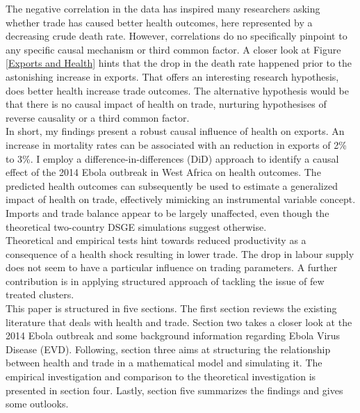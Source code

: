 \documentclass{article}
\begin{document}
The negative correlation in the data has inspired many researchers asking whether trade has caused better health outcomes, here represented by a decreasing crude death rate. However, correlations do no specifically pinpoint to any specific causal mechanism or third common factor. A closer look at Figure \ref{Exports and Health} hints that the drop in the death rate happened prior to the astonishing increase in exports. That offers an interesting research hypothesis, does better health increase trade outcomes. The alternative hypothesis would be that there is no causal impact of health on trade, nurturing hypothesises of reverse causality or a third common factor.\\
In short, my findings present a robust causal influence of health on exports. An increase in mortality rates can be associated with an reduction in exports of 2\% to 3\%. I employ a difference-in-differences (DiD) approach to identify a causal effect of the 2014 Ebola outbreak in West Africa on health outcomes. The predicted health outcomes can subsequently be used to estimate a generalized impact of health on trade, effectively mimicking an instrumental variable concept. Imports and trade balance appear to be largely unaffected, even though the theoretical two-country DSGE simulations suggest otherwise. \\
Theoretical and empirical tests hint towards reduced productivity as a consequence of a health shock resulting in lower trade. The drop in labour supply does not seem to have a particular influence on trading parameters. A further contribution is in applying structured approach of tackling the issue of few treated clusters.
\\
This paper is structured in five sections. The first section reviews the existing literature that deals with health and trade. Section two takes a closer look at the 2014 Ebola outbreak and some background information regarding Ebola Virus Disease (EVD). Following, section three aims at structuring the relationship between health and trade in a mathematical model and simulating it. The empirical investigation and comparison to the theoretical investigation is presented in section four. Lastly, section five summarizes the findings and gives some outlooks.

\pagebreak
\end{document}
